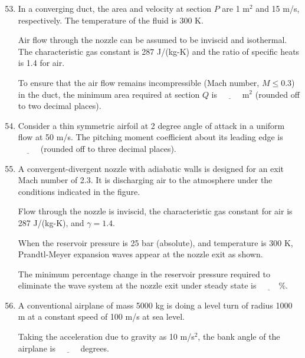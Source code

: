 \documentclass[journal,9pt,onecolumn]{IEEEtran}
\begin{document}
\begin{enumerate}
\setcounter{enumi}{52}
\item In a converging duct, the area and velocity at section $P$ are 1 m$^2$ and 15 m/s, respectively. The temperature of the fluid is 300 K.

    Air flow through the nozzle can be assumed to be inviscid and isothermal. The characteristic gas constant is 287 J/(kg-K) and the ratio of specific heats is 1.4 for air.

    To ensure that the air flow remains incompressible (Mach number, $M \leq 0.3$) in the duct, the minimum area required at section $Q$ is $\underline{\hspace{1cm}}$ m$^2$ (rounded off to two decimal places).  
\begin{center}
    
\end{center}

\item Consider a thin symmetric airfoil at 2 degree angle of attack in a uniform flow at 50 m/s. The pitching moment coefficient about its leading edge is $\underline{\hspace{1cm}}$ (rounded off to three decimal places).



 \item A convergent-divergent nozzle with adiabatic walls is designed for an exit Mach number of 2.3. It is discharging air to the atmosphere under the conditions indicated in the figure.

    Flow through the nozzle is inviscid, the characteristic gas constant for air is 287 J/(kg-K), and $\gamma = 1.4$.

    When the reservoir pressure is 25 bar (absolute), and temperature is 300 K, Prandtl-Meyer expansion waves appear at the nozzle exit as shown.

    The minimum percentage change in the reservoir pressure required to eliminate the wave system at the nozzle exit under steady state is $\underline{\hspace{1cm}}$\%.  
\begin{center}
    
\end{center}


\item A conventional airplane of mass 5000 kg is doing a level turn of radius 1000 m at a constant speed of 100 m/s at sea level.

Taking the acceleration due to gravity as 10 m/s$^2$, the bank angle of the airplane is $\underline{\hspace{1cm}}$ degrees.


\end{enumerate}
\end{document}
